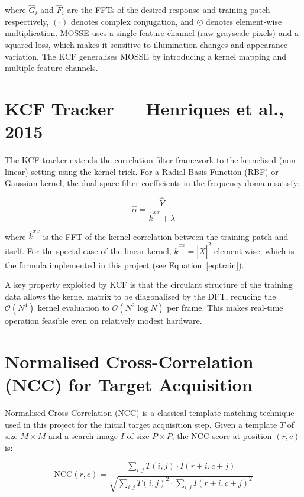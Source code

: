\documentclass[a4paper,12pt]{report}
\begin{document}
\noindent where $\hat{G}_i$ and $\hat{F}_i$ are the FFTs of the desired response and training patch respectively, $\overline{(\cdot)}$ denotes complex conjugation, and $\odot$ denotes element-wise multiplication. MOSSE uses a single feature channel (raw grayscale pixels) and a squared loss, which makes it sensitive to illumination changes and appearance variation. The KCF generalises MOSSE by introducing a kernel mapping and multiple feature channels.

\section{KCF Tracker --- Henriques et al., 2015}

The KCF tracker \cite{henriques2015} extends the correlation filter framework to the kernelised (non-linear) setting using the kernel trick. For a Radial Basis Function (RBF) or Gaussian kernel, the dual-space filter coefficients in the frequency domain satisfy:

\begin{equation}
\hat{\alpha} = \frac{\hat{Y}}{\hat{k}^{xx} + \lambda}
\end{equation}

\noindent where $\hat{k}^{xx}$ is the FFT of the kernel correlation between the training patch and itself. For the special case of the linear kernel, $\hat{k}^{xx} = |\hat{X}|^2$ element-wise, which is the formula implemented in this project (see Equation~\ref{eq:train}).

\par A key property exploited by KCF is that the circulant structure of the training data allows the kernel matrix to be diagonalised by the DFT, reducing the $\mathcal{O}(N^4)$ kernel evaluation to $\mathcal{O}(N^2 \log N)$ per frame. This makes real-time operation feasible even on relatively modest hardware.

\section{Normalised Cross-Correlation (NCC) for Target Acquisition}

Normalised Cross-Correlation (NCC) is a classical template-matching technique used in this project for the initial target acquisition step. Given a template $T$ of size $M \times M$ and a search image $I$ of size $P \times P$, the NCC score at position $(r, c)$ is:

\begin{equation}
\text{NCC}(r,c) = \frac{\sum_{i,j} T(i,j) \cdot I(r+i, c+j)}{\sqrt{\sum_{i,j} T(i,j)^2 \cdot \sum_{i,j} I(r+i,c+j)^2}}
\end{equation}
\end{document}

